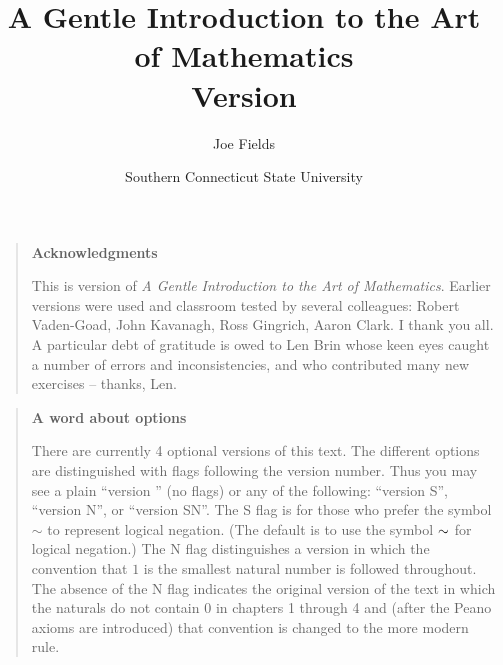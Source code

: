 \documentclass[dvips,12pt,twoside]{book}
\begin{document}
\frontmatter

\title{A Gentle Introduction to the Art of Mathematics\\ {\small Version \versionNum {} }}
\author{Joe Fields}
\date{Southern Connecticut State University}

\maketitle

\clearpage



\clearpage

\rule{0pt}{0pt}

\vfill

\begin{quote}
{\Large \bf Acknowledgments} 

   This is version \versionNum of {\em A Gentle Introduction to the Art of Mathematics}.
Earlier versions were used and classroom tested by several colleagues: 
Robert Vaden-Goad, John Kavanagh, Ross Gingrich, Aaron Clark.  I thank you all.  
A particular debt of gratitude is owed to Len Brin whose keen eyes caught 
a number of errors and inconsistencies, and who contributed many new 
exercises -- thanks, Len. 
  
\end{quote}

\vfill


\begin{quote}
{\Large \bf A word about options} 

There are currently 4 optional versions of this text.  The different options are distinguished with
flags following the version number.  Thus you may see a plain ``version  \versionNum'' (no flags) 
or any of the following: ``version \versionNum S'', ``version \versionNum N'',  or ``version \versionNum SN''. 
The S flag is for those who prefer the symbol $\sim$ to represent 
logical negation.  (The default is to
use the symbol $\savedlnot$ for logical negation.)  The N flag distinguishes a version in which
the convention that $1$ is the smallest natural number is followed throughout.  The absence
of the N flag indicates the original version of the text in which the naturals do not contain $0$
in chapters 1 through 4 and (after the Peano axioms are introduced) that convention is changed
to the more modern rule. 

\end{quote}
\end{document}
